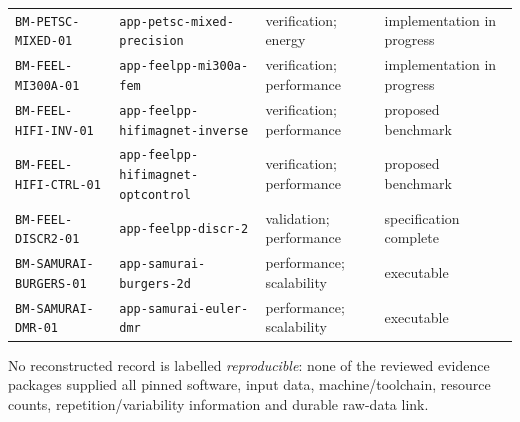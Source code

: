 \begin{longtable}{@{}>{\raggedright\arraybackslash}p{}>{\raggedright\arraybackslash}p{}>{\raggedright\arraybackslash}p{}>{\raggedright\arraybackslash}p{}@{}}
\nolinkurl{BM-PETSC-MIXED-01} & \nolinkurl{app-petsc-mixed-precision} & verification; energy & implementation in progress \\
\nolinkurl{BM-FEEL-MI300A-01} & \nolinkurl{app-feelpp-mi300a-fem} & verification; performance & implementation in progress \\
\nolinkurl{BM-FEEL-HIFI-INV-01} & \nolinkurl{app-feelpp-hifimagnet-inverse} & verification; performance & proposed benchmark \\
\nolinkurl{BM-FEEL-HIFI-CTRL-01} & \nolinkurl{app-feelpp-hifimagnet-optcontrol} & verification; performance & proposed benchmark \\
\nolinkurl{BM-FEEL-DISCR2-01} & \nolinkurl{app-feelpp-discr-2} & validation; performance & specification complete \\
\nolinkurl{BM-SAMURAI-BURGERS-01} & \nolinkurl{app-samurai-burgers-2d} & performance; scalability & executable \\
\nolinkurl{BM-SAMURAI-DMR-01} & \nolinkurl{app-samurai-euler-dmr} & performance; scalability & executable \\
\bottomrule
\end{longtable}
\endgroup

No reconstructed record is labelled \emph{reproducible}: none of the reviewed
evidence packages supplied all pinned software, input data, machine/toolchain,
resource counts, repetition/variability information and durable raw-data link.
